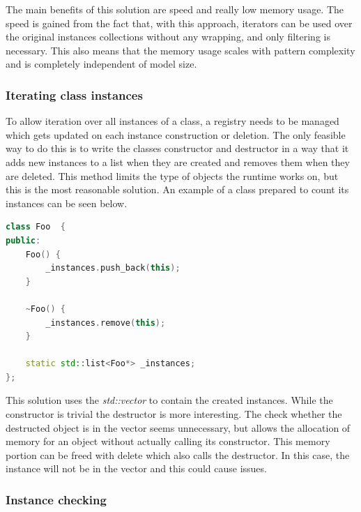 The main benefits of this solution are speed and really low memory usage. The
speed is gained from the fact that, with this approach, iterators can be used
over the original instances collections without any wrapping, and only
filtering is necessary. This also means that the memory usage scales with
pattern complexity and is completely independent of model size.

\subsubsection{Iterating class instances}\label{sect:IteratingClassInstances}

To allow iteration over all instances of a class, a registry needs to be managed
which gets updated on each instance construction or deletion. The only feasible
way to do this is to write the classes constructor and destructor in a way that
it adds new instances to a list when they are created and removes them when they
are deleted. This method limits the type of objects the runtime works on, but
this is the most reasonable solution. An example of a class prepared to count
its instances can be seen below.

\begin{lstlisting}[frame=single,float=!ht,language=C++]
class Foo  {
public:
	Foo() {
		_instances.push_back(this);
	}
	
	~Foo() {
		_instances.remove(this);
	}
		
	static std::list<Foo*> _instances;
};
\end{lstlisting}

This solution uses the \emph{std::vector} to contain the created instances.
While the constructor is trivial the destructor is more interesting. The
check whether the destructed object is in the vector seems unnecessary, but \CPP{}
allows the allocation of memory for an object without actually calling its
constructor. This memory portion can be freed with delete which also calls the
destructor. In this case, the instance will not be in the vector and this could
cause issues.

\subsubsection{Instance checking}\label{sect:InstanceChecking}


